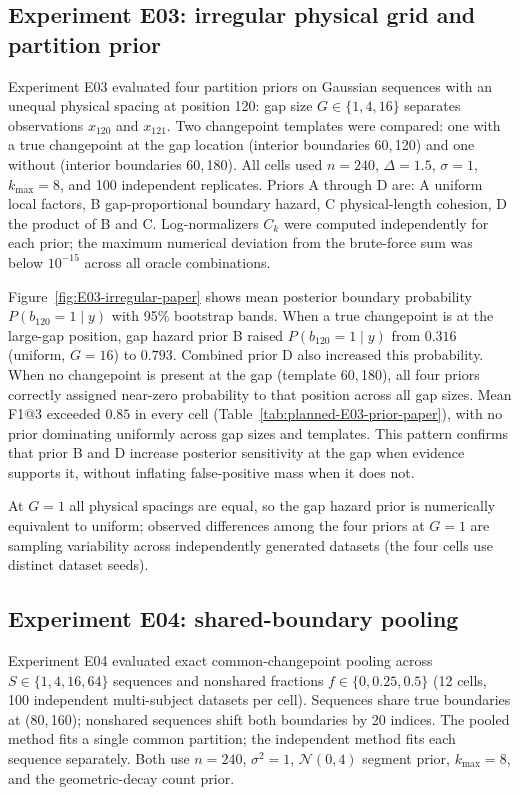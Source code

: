 \FloatBarrier
\subsection{Experiment E03: irregular physical grid and partition prior}
Experiment E03 evaluated four partition priors on Gaussian sequences with an unequal physical spacing at position 120: gap size $G\in\{1,4,16\}$ separates observations $x_{120}$ and $x_{121}$. Two changepoint templates were compared: one with a true changepoint at the gap location (interior boundaries 60,\,120) and one without (interior boundaries 60,\,180). All cells used $n=240$, $\Delta=1.5$, $\sigma=1$, $k_{\max}=8$, and 100 independent replicates. Priors A through D are: A uniform local factors, B gap-proportional boundary hazard, C physical-length cohesion, D the product of B and C. Log-normalizers $C_k$ were computed independently for each prior; the maximum numerical deviation from the brute-force sum was below $10^{-15}$ across all oracle combinations.

Figure~\ref{fig:E03-irregular-paper} shows mean posterior boundary probability $P(b_{120}=1\mid y)$ with 95\% bootstrap bands. When a true changepoint is at the large-gap position, gap hazard prior B raised $P(b_{120}=1\mid y)$ from $0.316$ (uniform, $G=16$) to $0.793$. Combined prior D also increased this probability. When no changepoint is present at the gap (template 60,\,180), all four priors correctly assigned near-zero probability to that position across all gap sizes. Mean F1@3 exceeded $0.85$ in every cell (Table~\ref{tab:planned-E03-prior-paper}), with no prior dominating uniformly across gap sizes and templates. This pattern confirms that prior B and D increase posterior sensitivity at the gap when evidence supports it, without inflating false-positive mass when it does not.

At $G=1$ all physical spacings are equal, so the gap hazard prior is numerically equivalent to uniform; observed differences among the four priors at $G=1$ are sampling variability across independently generated datasets (the four cells use distinct dataset seeds).





\FloatBarrier
\subsection{Experiment E04: shared-boundary pooling}
Experiment E04 evaluated exact common-changepoint pooling across $S\in\{1,4,16,64\}$ sequences and nonshared fractions $f\in\{0,0.25,0.5\}$ (12 cells, 100 independent multi-subject datasets per cell). Sequences share true boundaries at (80,\,160); nonshared sequences shift both boundaries by 20 indices. The pooled method fits a single common partition; the independent method fits each sequence separately. Both use $n=240$, $\sigma^2=1$, $\mathcal{N}(0,4)$ segment prior, $k_{\max}=8$, and the geometric-decay count prior.

